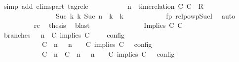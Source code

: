 \begin{isabellebody}
\ {\isacharparenleft}simp\ add{\isacharcolon}\ elims{\isacharunderscore}part\ tagrel{\isacharunderscore}e{\isacharparenright}\isanewline
\ \ \ \ \ \ \ \ \isamarkupfalse%
\ {\isacartoucheopen}{\isacharparenleft}{\isasymGamma}{\isacharcomma}\ n\ {\isasymturnstile}\ {\isacharparenleft}time{\isacharminus}relation\ {\isasymlfloor}C\ C\ {\isasymin}\ R{\isacharparenright}\ {\isacharhash}\ {\isasymPsi}\ {\isasymtriangleright}\ {\isasymPhi}{\isacharparenright}\isanewline
\ \ \ \ \ \ \ \ \ \ \ \ \ \ \ \ {\isasymhookrightarrow}\isactrlbsup Suc\ k\isactrlesup \ {\isacharparenleft}{\isasymGamma}\isactrlsub k{\isacharcomma}\ Suc\ n\ {\isasymturnstile}\ {\isasymPsi}\isactrlsub k\ {\isasymtriangleright}\ {\isasymPhi}\isactrlsub k{\isacharparenright}{\isacartoucheclose}\isanewline
\ \ \ \ \ \ \ \ \ \ \isamarkupfalse%
\ fp\ relpowp{\isacharunderscore}Suc{\isacharunderscore}I{}\ \isamarkupfalse%
\ auto\isanewline
\ \ \ \ \ \ \ \ \isamarkupfalse%
\ rc\ \isamarkupfalse%
\ {\isacharquery}thesis\ \isamarkupfalse%
\ blast\isanewline
\ \ \ \ \ \ \isamarkupfalse%
\isanewline
\ \ \isamarkupfalse%
\isanewline
\ \ \ \ \isamarkupfalse%
\ {\isacharparenleft}Implies\ C\ C\isanewline
\ \ \ \ \ \ \isamarkupfalse%
\ branches{\isacharcolon}\ {\isacartoucheopen}{\isasymlbrakk}\ {\isasymGamma}{\isacharcomma}\ n\ {\isasymturnstile}\ {\isacharparenleft}{\isacharparenleft}C\ implies\ C\ {\isacharhash}\ {\isasymPsi}{\isacharparenright}\ {\isasymtriangleright}\ {\isasymPhi}\ {\isasymrbrakk}\isactrlsub c\isactrlsub o\isactrlsub n\isactrlsub f\isactrlsub i\isactrlsub g\isanewline
\ \ \ \ \ \ \ \ \ \ {\isacharequal}\ {\isasymlbrakk}\ {\isacharparenleft}{\isacharparenleft}C\ {\isasymnot}{\isasymUp}\ n{\isacharparenright}\ {\isacharhash}\ {\isasymGamma}{\isacharparenright}{\isacharcomma}\ n\ {\isasymturnstile}\ {\isasymPsi}\ {\isasymtriangleright}\ {\isacharparenleft}{\isacharparenleft}C\ implies\ C\ {\isacharhash}\ {\isasymPhi}{\isacharparenright}\ {\isasymrbrakk}\isactrlsub c\isactrlsub o\isactrlsub n\isactrlsub f\isactrlsub i\isactrlsub g\isanewline
\ \ \ \ \ \ \ \ \ \ {\isasymunion}\ {\isasymlbrakk}\ {\isacharparenleft}{\isacharparenleft}C\ {\isasymUp}\ n{\isacharparenright}\ {\isacharhash}\ {\isacharparenleft}C\ {\isasymUp}\ n{\isacharparenright}\ {\isacharhash}\ {\isasymGamma}{\isacharparenright}{\isacharcomma}\ n\ {\isasymturnstile}\ {\isasymPsi}\ {\isasymtriangleright}\ {\isacharparenleft}{\isacharparenleft}C\ implies\ C\ {\isacharhash}\ {\isasymPhi}{\isacharparenright}\ {\isasymrbrakk}\isactrlsub c\isactrlsub o\isactrlsub n\isactrlsub f\isactrlsub i\isactrlsub g{\isacartoucheclose}\isanewline

\end{isabellebody}
